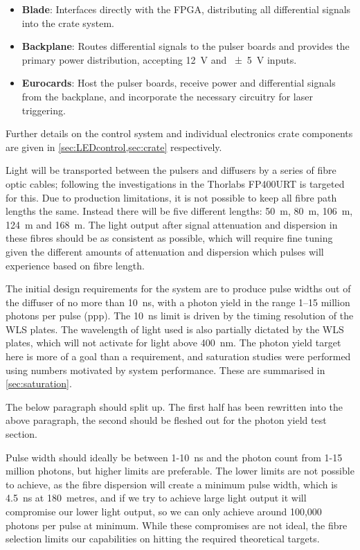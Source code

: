 \documentclass[a4paper,11pt]{article}
\begin{document}
\begin{itemize}
\item \textbf{Blade}: Interfaces directly with the FPGA, distributing all differential signals into the crate system.
\item \textbf{Backplane}: Routes differential signals to the pulser boards and provides the primary power distribution, accepting \SI{12}{\volt} and \SI{\pm5}{\volt} inputs.
\item \textbf{Eurocards}: Host the pulser boards, receive power and differential signals from the backplane, and incorporate the necessary circuitry for laser triggering.
\end{itemize}
Further details on the control system and individual electronics crate components are given in \cref{sec:LEDcontrol,sec:crate} respectively.

Light will be transported between the pulsers and diffusers by a series of fibre optic cables; following the investigations in \cite{TN91} the Thorlabs FP400URT \cite{FP400URT} is targeted for this. Due to production limitations, it is not possible to keep all fibre path lengths the same. Instead there will be five different lengths: 50~m, 80~m, 106~m, 124~m and 168~m. The light output after signal attenuation and dispersion in these fibres should be as consistent as possible, which will require fine tuning given the different amounts of attenuation and dispersion which pulses will experience based on fibre length.

The initial design requirements for the system are to produce pulse widths out of the diffuser of no more than 10~ns, with a photon yield in the range 1--15 million photons per pulse (ppp). The 10~ns limit is driven by the timing resolution of the WLS plates. The wavelength of light used is also partially dictated by the WLS plates, which will not activate for light above 400~nm. The photon yield target here is more of a goal than a requirement, and saturation studies were performed using numbers motivated by system performance. These are summarised in \cref{sec:saturation}.

{\color{red} The below paragraph should split up. The first half has been rewritten into the above paragraph, the second should be fleshed out for the photon yield test section.

Pulse width should ideally be between 1-10~ns and the photon count from 1-15 million photons, but higher limits are preferable. The lower limits are not possible to achieve, as the fibre dispersion will create a minimum pulse width, which is 4.5~ns at 180~metres, and if we try to achieve large light output it will compromise our lower light output, so we can only achieve around 100,000 photons per pulse at minimum. While these compromises are not ideal, the fibre selection limits our capabilities on hitting the required theoretical targets.
}
\end{document}
